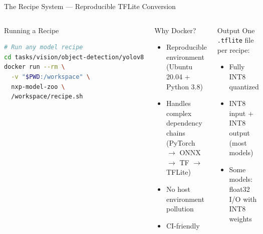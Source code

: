 \documentclass[aspectratio=169]{beamer}
\begin{document}
\begin{frame}[fragile]{The Recipe System — Reproducible TFLite Conversion}
\begin{columns}[T]
\begin{block}{Running a Recipe}
\begin{lstlisting}[language=bash]
# Run any model recipe
cd tasks/vision/object-detection/yolov8
docker run --rm \
  -v "$PWD:/workspace" \
  nxp-model-zoo \
  /workspace/recipe.sh
        \end{lstlisting}
      \end{block}
      \begin{block}{Why Docker?}
        \begin{itemize}\scriptsize
          \item Reproducible environment (Ubuntu 20.04 + Python 3.8)
          \item Handles complex dependency chains (PyTorch $\to$ ONNX $\to$ TF $\to$ TFLite)
          \item No host environment pollution
          \item CI-friendly
        \end{itemize}
      \end{block}
      \vspace{4pt}
      \begin{alertblock}{Output}
        \scriptsize
        One \texttt{.tflite} file per recipe:
        \begin{itemize}
          \item Fully INT8 quantized
          \item INT8 input + INT8 output (most models)
          \item Some models: float32 I/O with INT8 weights
        \end{itemize}
      \end{alertblock}
  \end{columns}
\end{frame}
\end{document}
